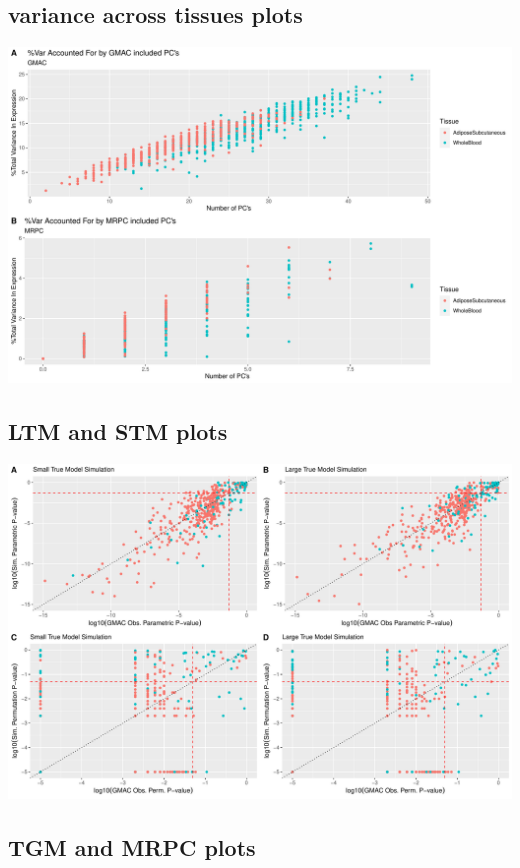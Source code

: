 \documentclass[
]{article}
\begin{document}
\hypertarget{variance-across-tissues-plots}{%
\subsection{variance across tissues
plots}\label{variance-across-tissues-plots}}

\includegraphics{GMACwriteup_files/figure-latex/unnamed-chunk-5-1.pdf}

\hypertarget{ltm-and-stm-plots}{%
\subsection{LTM and STM plots}\label{ltm-and-stm-plots}}

\includegraphics{GMACwriteup_files/figure-latex/unnamed-chunk-6-1.pdf}

\hypertarget{tgm-and-mrpc-plots}{%
\subsection{TGM and MRPC plots}\label{tgm-and-mrpc-plots}}
\end{document}
